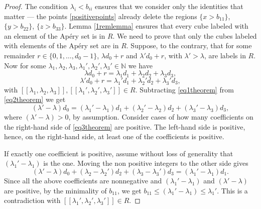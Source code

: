 \documentclass[10pt,a4paper]{amsart}
\begin{document}
\begin{proof}
The condition $\lambda_i < b_{ii}$ ensures that we consider only the identities that matter --- the points \eqref{positivepoints} already delete the regions $\{x > b_{11}\}$, $\{y > b_{22}\}$, $\{z > b_{33}\}$. Lemma \ref{1remlemma} ensures that every cube labeled with an element of the Ap{\'e}ry set is in $R$. We need to prove that only the cubes labeled with elements of the Ap{\'e}ry set are in $R$. Suppose, to the contrary, that for some remainder $r \in \{0,1,\dots,d_0-1\}$, $\lambda d_0 + r$ and $\lambda' d_0 + r$, with $\lambda' > \lambda$, are labels in $R$. Now for some $\lambda_1, \lambda_2, \lambda_3,\lambda_1', \lambda_2', \lambda_3' \in \mathbb{N}$ we have
    \begin{equation}\label{eq1theorem}
        \lambda d_0 + r = \lambda_1d_1 + \lambda_2d_2 + \lambda_3d_3,
    \end{equation}
     \begin{equation}\label{eq2theorem}
        \lambda' d_0 + r = \lambda_1'd_1 + \lambda_2'd_2 + \lambda_3'd_3,
    \end{equation}
    with $[[\lambda_1,\lambda_2,\lambda_3]], [[\lambda_1',\lambda_2',\lambda_3']] \in R$.
    Subtracting \eqref{eq1theorem} from \eqref{eq2theorem} we get
    \begin{equation}\label{eq3theorem}
        (\lambda' - \lambda)d_0 = (\lambda_1' - \lambda_1)d_1 + (\lambda_2' - \lambda_2)d_2 + (\lambda_3' - \lambda_3)d_3,
    \end{equation}
    where $(\lambda' - \lambda)>0$, by assumption. Consider cases of how many coefficients on the right-hand side of \eqref{eq3theorem} are positive. The left-hand side is positive, hence, on the right-hand side, at least one of the coefficients is positive. 
    
If exactly one coefficient is positive, assume without loss of generality that $(\lambda_1' - \lambda_1)$ is the one. Moving the non positive integers to the other side gives
    \begin{equation}\label{eq4theorem}
        (\lambda' - \lambda)d_0  + (\lambda_2 - \lambda_2')d_2 + (\lambda_3 - \lambda_3')d_3= (\lambda_1' - \lambda_1)d_1.
    \end{equation} 
Since all the above coefficients are nonnegative and $(\lambda_1' - \lambda_1)$ and $(\lambda' - \lambda) $ are positive, by the minimality of $b_{11}$, we get $b_{11} \leq (\lambda_1' - \lambda_1) \leq \lambda_1'$. This is a contradiction with $[[\lambda_1',\lambda_2',\lambda_3']] \in R$.


\end{proof}
\end{document}

